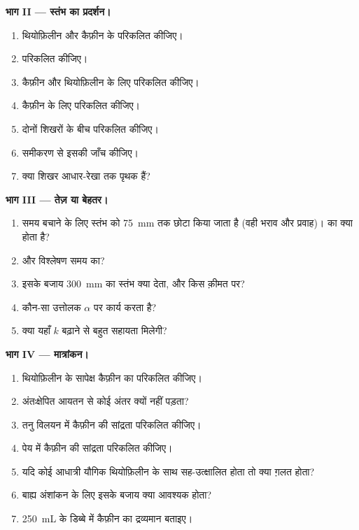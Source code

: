 \begin{problem}
\medskip
\noindent\textbf{भाग II --- स्तंभ का प्रदर्शन।}
\begin{enumerate}[resume]
  \item थियोफ़िलीन और कैफ़ीन के  परिकलित कीजिए।
  \item {} परिकलित कीजिए।
  \item कैफ़ीन और थियोफ़िलीन के लिए  परिकलित कीजिए।
  \item कैफ़ीन के लिए  परिकलित कीजिए।
  \item दोनों शिखरों के बीच  परिकलित कीजिए।
  \item {} समीकरण से इसकी जाँच कीजिए।
  \item क्या शिखर आधार-रेखा तक पृथक हैं?
\end{enumerate}

\medskip
\noindent\textbf{भाग III --- तेज़ या बेहतर।}
\begin{enumerate}[resume]
  \item समय बचाने के लिए स्तंभ को \qty{75}{mm} तक छोटा किया जाता है (वही भराव और प्रवाह)।  का
        क्या होता है?
  \item और विश्लेषण समय का?
  \item इसके बजाय \qty{300}{mm} का स्तंभ क्या देता, और किस क़ीमत पर?
  \item कौन-सा उत्तोलक $\alpha$ पर कार्य करता है?
  \item क्या यहाँ $k$ बढ़ाने से बहुत सहायता मिलेगी?
\end{enumerate}

\medskip
\noindent\textbf{भाग IV --- मात्रांकन।}
\begin{enumerate}[resume]
  \item थियोफ़िलीन के सापेक्ष कैफ़ीन का  परिकलित कीजिए।
  \item अंतःक्षेपित आयतन से कोई अंतर क्यों नहीं पड़ता?
  \item तनु विलयन में कैफ़ीन की सांद्रता परिकलित कीजिए।
  \item पेय में कैफ़ीन की सांद्रता परिकलित कीजिए।
  \item यदि कोई आधात्री यौगिक थियोफ़िलीन के साथ सह-उत्क्षालित होता तो क्या ग़लत होता?
  \item बाह्य अंशांकन के लिए इसके बजाय क्या आवश्यक होता?
  \item \qty{250}{mL} के डिब्बे में कैफ़ीन का द्रव्यमान बताइए।
\end{enumerate}
\end{problem}
